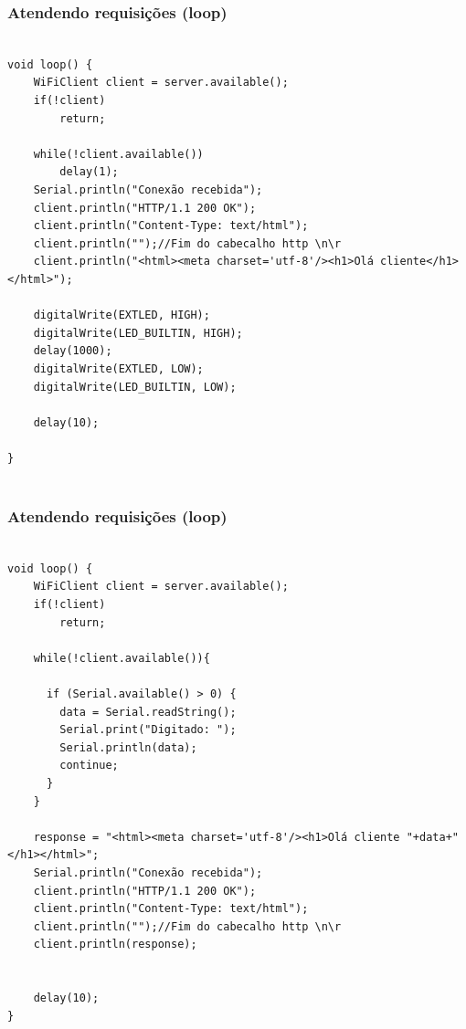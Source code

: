 \documentclass{beamer}
\begin{document}
\begin{frame}[fragile]
\frametitle{Atendendo requisições (loop)}

\tiny
\begin{lstlisting}

void loop() {
    WiFiClient client = server.available();
    if(!client)
        return;
        
    while(!client.available())
        delay(1);
    Serial.println("Conexão recebida");
    client.println("HTTP/1.1 200 OK");
    client.println("Content-Type: text/html");
    client.println("");//Fim do cabecalho http \n\r
    client.println("<html><meta charset='utf-8'/><h1>Olá cliente</h1></html>");

    digitalWrite(EXTLED, HIGH);
    digitalWrite(LED_BUILTIN, HIGH);
    delay(1000);
    digitalWrite(EXTLED, LOW);
    digitalWrite(LED_BUILTIN, LOW);

    delay(10);
  
}
 
\end{lstlisting}
\end{frame}


\begin{frame}[fragile]
\frametitle{Atendendo requisições (loop)}

\tiny
\begin{lstlisting}

void loop() {
    WiFiClient client = server.available();
    if(!client)
        return;

    while(!client.available()){

      if (Serial.available() > 0) {
        data = Serial.readString();
        Serial.print("Digitado: ");
        Serial.println(data);  
        continue;
      }
    }

    response = "<html><meta charset='utf-8'/><h1>Olá cliente "+data+"</h1></html>";
    Serial.println("Conexão recebida");
    client.println("HTTP/1.1 200 OK");
    client.println("Content-Type: text/html");
    client.println("");//Fim do cabecalho http \n\r
    client.println(response);


    delay(10);  
}
 
\end{lstlisting}
\end{frame}
\end{document}
